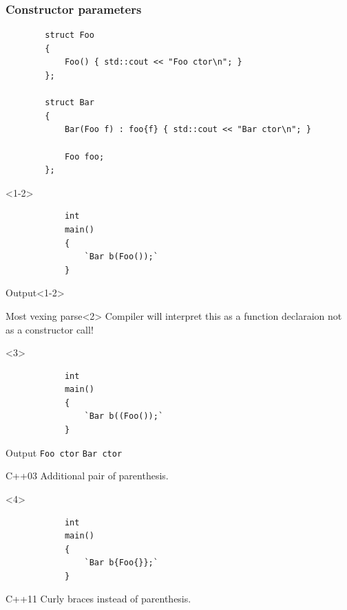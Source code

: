 \documentclass{beamer}
\begin{document}
\begin{frame}[fragile,t]
\frametitle{Constructor parameters}
    \begin{lstlisting}
        struct Foo
        {
            Foo() { std::cout << "Foo ctor\n"; }
        };

        struct Bar
        {
            Bar(Foo f) : foo{f} { std::cout << "Bar ctor\n"; }

            Foo foo;
        };
    \end{lstlisting}
    \hrulefill
    \begin{onlyenv}<1-2>
        \begin{lstlisting}
            int
            main()
            {
                `Bar b(Foo());`
            }
        \end{lstlisting}
        \begin{block}{Output}<1-2>
        \end{block}
        \begin{alertblock}{Most vexing parse}<2>
            Compiler will interpret this as a function declaraion not as a constructor call!
        \end{alertblock}
    \end{onlyenv}
    \begin{onlyenv}<3>
        \begin{lstlisting}
            int
            main()
            {
                `Bar b((Foo());`
            }
        \end{lstlisting}
        \begin{block}{Output}
            \texttt{Foo ctor} \newline
            \texttt{Bar ctor}
        \end{block}
        \begin{block}{C++03}
            Additional pair of parenthesis.
        \end{block}
    \end{onlyenv}
    \begin{onlyenv}<4>
        \begin{lstlisting}
            int
            main()
            {
                `Bar b{Foo{}};`
            }
        \end{lstlisting}
        \begin{block}{C++11}
            Curly braces instead of parenthesis.
        \end{block}
    \end{onlyenv}
\end{frame}
\end{document}
